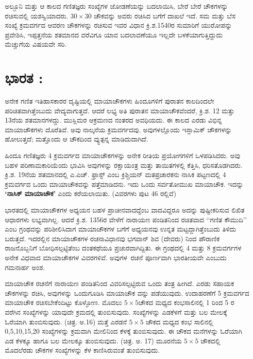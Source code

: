 ಅಲ್ಬೂನಿ ಮತ್ತು ಆ ಕಾಲದ ಗಣಿತಜ್ಞರು ಸಂಖ್ಯೆಗಳ ಜೋಡಣೆಯನ್ನು ಬದಲಾಯಿಸಿ, ಬೇರೆ ಬೇರೆ ಚೌಕಗಳನ್ನು ರಚಿಸುವಲ್ಲಿ ಯಶಸ್ವಿಯಾದರು. $30 \times 30$ ಚೌಕವನ್ನು ಅವರು ರಚಿಸಿದ ಬಗೆಗೆ ದಾಖಲೆ ಇದೆ. ಸಮ ಮತ್ತು ಬೆಸ ಸಂಖ್ಯೆ ಕ್ರಮವರ್ಗದ ಆವರಣ ಚೌಕಗಳನ್ನು ರಚಿಸುವ ಇವರ ವಿಧಾನ ಕ್ರಿ.ಶ.1540ರ ಸುಮಾರಿಗೆ ಯುರೋಪನ್ನು  ಪ್ರವೇಶಿಸಿ, ಇಪ್ಪತ್ತನೆಯ ಶತಮಾನದ ವರೆವಿಗೂ ಯಾವ ಬದಲಾವಣೆಯೂ ಇಲ್ಲದೇ ಬಳಕೆಯಾಗುತ್ತಿದ್ದುದು ಮೆಚ್ಚುಗೆಯ ವಿಷಯವೇ ಸರಿ.

\section*{ಭಾರತ :}

ಅನೇಕ ಗಣಿತ ಇತಿಹಾಸಕಾರರ ದೃಷ್ಟಿಯಲ್ಲಿ ಮಾಯಾಚೌಕಗಳು ಹಿಂದೂಗಳಿಗೆ ಪುರಾತನ ಕಾಲದಿಂದಲೇ ಪರಿಚಿತವಾಗಿತ್ತೆಂಬುದು ವೇದ್ಯವಾಗುತ್ತದೆ. ಆದರೆ ಲಭ್ಯ ಅತಿ ಪುರಾತನ ಮಾಯಾ\-ಚೌಕವೆಂದರೆ, ಕ್ರಿ.ಶ. 12 ಮತ್ತು 13ನೆಯ ಶತಮಾನಗಳದ್ದು. ಮುಸ್ಲಿಮರ ಆಕ್ರಮಣದ \hbox{ನಂತರದ} ಅವಧಿಯದು. ಈ ಕಾಲದ ಎರಡು ವಿಭಿನ್ನ ಮಾಯಾಚೌಕಗಳು ದೊರೆತಿವೆ. ಅವು ನಾಲ್ಕನೆಯ ಕ್ರಮವರ್ಗದವು. ಅವುಗಳಲ್ಲೊಂದು ಇಸ್ಲಾಮಿಕ್ ಚೌಕಗಳನ್ನು ಹೋಲುತ್ತದೆ; ಮತ್ತೊಂದು ಆ ಚೌಕದಿಂದ ವ್ಯುತ್ಪನ್ನ ಮಾಡಿದುದಾಗಿದೆ.

ಹಿಂದೂ ಗಣಿತಜ್ಞರು 4 ಕ್ರಮವರ್ಗದ ಮಾಯಾಚೌಕಗಳನ್ನು ಅನೇಕ ರೀತಿಯ ಪ್ರಯೋಗ\-ಗಳಿಗೆ ಒಳಪಡಿಸಿದರು. ಅವು ಬಹಳ ಪರಿಣಾಮಕಾರಿಯೆಂದು ಭಾವಿಸಿ ಅವುಗಳನ್ನು ರಕ್ಷಾಯಂತ್ರ ಮತ್ತು ತಾಯಿತಗಳಲ್ಲಿ ಕೆತ್ತಿಸಿ, ಧರಿಸತೊಡಗಿದರು. ಕ್ರಿ.ಶ. 19ನೆಯ ಶತಮಾನದಲ್ಲಿ ಎ.ಎಚ್. ಫ್ರಾಸ್ಟ್ ಎಂಬ ಕ್ರಿಶ್ಚಿಯನ್ ಮತಪ್ರಚಾರಕನು ನಾಸಿಕ ಪಟ್ಟಣದಲ್ಲಿ 4 ಕ್ರಮವರ್ಗದ ಒಂದು ಮಾಯಾಚೌಕವನ್ನು ಪತ್ತೆಮಾಡಿದನು. ಇದು ಒಂದು ಸರ್ವತೋಮುಖ ಮಾಯಾಚೌಕ. ಇದನ್ನು \textbf{‘ನಾಸಿಕ್ ಮಾಯಾಚೌಕ’} ಎಂದು ಕರೆಯಲಾಯಿತು. (ವಿವರಗಳು ಪುಟ 46 ರಲ್ಲಿವೆ)

ಭಾರತದಲ್ಲಿ ಮಾಯಾಚೌಕಗಳ ಅಧ್ಯಯನ ಬಹಳ ಪ್ರಾಚೀನವಾದದ್ದೆಂಬ ವಾದವಿದ್ದರೂ ಅದನ್ನು ಪುಷ್ಟೀಕರಿಸುವ ಲಿಖಿತ ಆಧಾರಗಳು ಲಭ್ಯವಾಗಿಲ್ಲ. ಆದರೆ ಕ್ರಿ.ಶ. 1356ರ ವೇಳೆಗೆ \hbox{ನಾರಾಯಣ} ಪಂಡಿತನಿಂದ ರಚಿತವಾದ ‘‘ಗಣಿತ ಕೌಮುದಿ’’ ಎಂಬ ಗ್ರಂಥವನ್ನು ಪರಿಶೀಲಿಸಿದಾಗ ಮಾಯಾಚೌಕಗಳ ಬಗೆಗೆ ಅಧ್ಯಯನವು ಉನ್ನತ ಮಟ್ಟದ್ದಾಗಿತ್ತೆಂಬುದು ತಿಳಿದು ಬರುತ್ತದೆ. ಇದರಲ್ಲಿನ ಮಾಯಾಚೌಕಗಳ ರಚನಾವಿಧಾನವು ಭಗವಾನ್ ಶಿವ (ದೇವರು) ನಿಂದ ಪೌರಾಣಿಕ ರಾಜನೊಬ್ಬನಿಗೆ ಬೋಧಿಸಲ್ಪಟ್ಟಿತೆಂಬ ದಂತಕಥೆಯೂ ಪ್ರಚುರವಾಗಿದ್ದಿತು. ಈ ಗ್ರಂಥದಲ್ಲಿ 4 ಮತ್ತು 8 ಕ್ರಮವರ್ಗಗಳ ಅನೇಕ ವಿಧವಾದ ಮಾಯಾಚೌಕಗಳ ವಿವರಗಳಿವೆ. \hbox{ಅವುಗಳ ರಚನೆ} ಪೂರ್ಣವಾಗಿ ಭಾರತೀಯವೇ ಎಂಬುದು ಗಮನಾರ್ಹ ಅಂಶ.
\eject

ಮಾಯಾಚೌಕ ರಚನೆಗೆ ನಾರಾಯಣ ಪಂಡಿತನಿಂದ ವಿವರಿಸಲ್ಪಟ್ಟಿರುವ ಒಂದು ತಂತ್ರ \hbox{ಹೀಗಿದೆ.} ಎರಡು ಸಹಾಯಕ ಚೌಕಗಳನ್ನು ರಚಿಸಿ, ಅವುಗಳನ್ನು ಒಂದುಗೂಡಿಸಿ ಮಾಯಾಚೌಕ ವನ್ನು ಪಡೆಯುವುದು. ಉದಾಹರಣೆಗೆ 5 ಕ್ರಮವರ್ಗದ ಮಾಯಾಚೌಕ ರಚಿಸಬೇಕೆಂದಿಟ್ಟು ಕೊಳ್ಳೋಣ. ಮೊದಲು $5 \times 5$ಚೌಕದ ಮಧ್ಯದ ಕಂಭಸಾಲಿನಲ್ಲಿ 1 ರಿಂದ 5 ರ ವರೆಗಿನ ಸಂಖ್ಯೆ\-ಗಳನ್ನು ಯಾವುದೇ ಕ್ರಮದಲ್ಲಿ ತುಂಬಿಸುವುದು. ಸಂಖ್ಯೆಗಳನ್ನು ಎಡಕೆಳಗೆ ಮತ್ತು ಬಲ ಮೇಲಕ್ಕೆ ಓರೆಯಾಗಿ ತುಂಬಿಸುವುದು. (ಚಿತ್ರ. ಅ.16) ಮತ್ತೆ ಎರಡನೆ $5 \times 5$ ಚೌಕದ ಮಧ್ಯದ ಕಂಭ ಸಾಲಿನಲ್ಲಿ 0,5,10,15,20 ಸಂಖ್ಯೆಗಳನ್ನು ಕ್ರಮವಾಗಿ ಮೇಲಿನಿಂದ ಕೆಳಕ್ಕೆ ತುಂಬಿಸುವುದು. ಈ ಚೌಕದ ಮನೆಗಳನ್ನು ಓರೆಯಾಗಿ ಎಡ ಕೆಳಕ್ಕೂ ಹಾಗೂ ಬಲ ಮೇಲಕ್ಕೂ ತುಂಬಿಸುವುದು. \linebreak (ಚಿತ್ರ. ಅ. 17) ಮೂರನೆಯ $5 \times 5$ ಚೌಕದಲ್ಲಿ ಮೊದಲೆರಡು ಚೌಕಗಳ ಸಂಖ್ಯೆಗಳನ್ನು ಕೆಳ ಕಾಣಿಸಿರುವಂತೆ ತುಂಬಿಸುವುದು.

